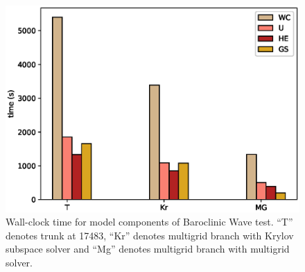 \begin{figure}[ht!]
\centering\includegraphics[width=1.0\linewidth]{figs/mg-improvement.eps}
\caption{\label{fig:mg}Wall-clock time for model components of
  Baroclinic Wave test. ``T'' denotes trunk at 17483, ``Kr'' denotes
  multigrid branch with Krylov subspace solver and ``Mg'' denotes
  multigrid branch with multigrid solver.}
\end{figure} 